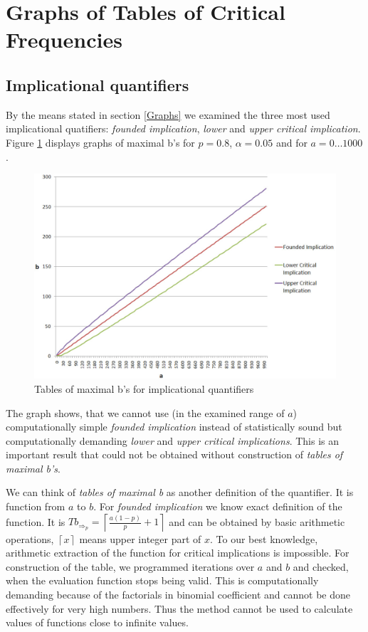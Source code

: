 \section{Graphs of Tables of Critical Frequencies} \label{Graphs_Tables}

\subsection{Implicational quantifiers}
By the means stated in section \ref{Graphs} we examined the three most used implicational quatifiers: 
\emph{founded implication}, \emph{lower} and \emph{upper critical implication}. Figure \ref{fig:Implicational} displays graphs of maximal b's for $p=0.8$, $\alpha=0.05$ and for $a=0\dots1000$.

\begin{figure}[ht]
\centering
\includegraphics[width=115mm]{Implicational.eps}
\caption{Tables of maximal b's for implicational quantifiers}
\label{fig:Implicational}
\end{figure}

The graph shows, that we cannot use (in the examined range of $a$) computationally simple \emph{founded implication} instead of statistically sound but computationally demanding \emph{lower} and \emph{upper critical implications}. This is an important result that could not be obtained without construction of \emph{tables of maximal b's}.

We can think of \emph{tables of maximal b} as another definition of the quantifier. It is function from $a$ to $b$. For \emph{founded implication} we know exact definition of the function. It is 
%
%
%
$ Tb_{\Rightarrow_{p}} = \left\lceil \frac{a(1-p)}{p} + 1 \right\rceil$
%
and can be obtained by basic arithmetic operations, $ \left\lceil x \right\rceil$ means upper integer part of $x$. 
To our best knowledge, arithmetic extraction of the function for critical implications is impossible. For construction of the table, we programmed iterations over $a$ and $b$ and checked, when the evaluation function stops being valid. This is computationally demanding because of the factorials in binomial coefficient and cannot be done effectively for very high numbers. Thus the method cannot be used to calculate values of functions close to infinite values.

